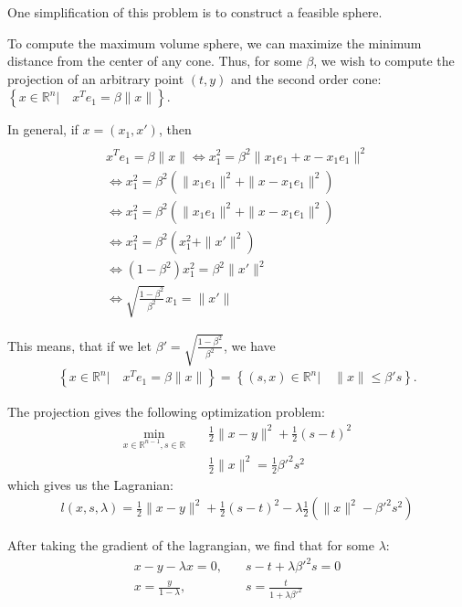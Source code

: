 \documentclass{article}
\theoremstyle{case}
\begin{document}
One simplification of this problem is to construct a feasible sphere.

To compute the maximum volume sphere, we can maximize the minimum distance from the center of any cone.
Thus, for some $\beta$, we wish to compute the projection of an arbitrary point $(t, y)$ and the second order cone: $\left\{ x \in \mathbb R^n | \quad x^Te_1 = \beta \|x\| \right\}$.

In general, if $x = (x_1, x')$, then
\begin{align*}
 \\
x^Te_1 = \beta \|x\| 
 \Longleftrightarrow x_1^2 = \beta^2 \|x_1e_1  + x - x_1 e_1\|^2 \\
 \Longleftrightarrow x_1^2 = \beta^2 \left(\|x_1e_1\|^2  + \|x - x_1 e_1\|^2\right) \\
 \Longleftrightarrow x_1^2 = \beta^2 \left(\|x_1e_1\|^2  + \|x - x_1 e_1\|^2\right) \\
 \Longleftrightarrow x_1^2 = \beta^2 \left(x_1^2  + \|{x'}\|^2 \right) \\
 \Longleftrightarrow (1 - \beta^2)x_1^2 = \beta^2 \|{x'}\|^2 \\
 \Longleftrightarrow \sqrt{\frac{1 - \beta^2}{ \beta^2}} x_1 = \|{x'}\|
\end{align*}

This means, that if we let $\beta' = \sqrt{\frac{1 - \beta^2}{\beta^2}}$, we have
\begin{align*}
\left\{ x \in \mathbb R^n | \quad x^Te_1 = \beta \|x\| \right\} = \left \{(s, x)\in \mathbb R^n | \quad\|x\| \le \beta' s \right\}.
\end{align*}

The projection gives the following optimization problem:
\begin{align*}
\min_{x \in \mathbb R^{n-1}, s \in \mathbb R} & \quad \frac 1 2 \|x - y\|^2 + \frac 1 2 (s - t)^2 \\
			& \quad \frac 1 2 \|x\|^2 = \frac 1 2 {\beta'}^2 s^2
\end{align*}
which gives us the Lagranian:
\begin{align*}
l(x, s, \lambda) = \frac 1 2 \|x - y \|^2 + \frac 1 2 \left(s - t\right)^2 - \lambda \frac 1 2 \left(\|x\|^2 - {\beta'}^2 s^2\right)
\end{align*}

After taking the gradient of the lagrangian, we find that for some $\lambda$:
\begin{align*}
x - y - \lambda x = 0, & \quad s - t + \lambda {\beta'}^2 s = 0 \\
x = \frac {y}{1 - \lambda}, & \quad s = \frac {t}{1 + \lambda {\beta'}^2 } \\
\end{align*}
\end{document}
